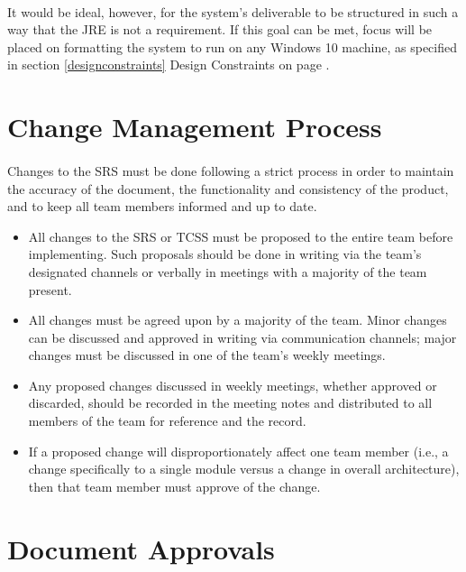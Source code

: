 \documentclass{article}
\begin{document}
    \paragraph{} It would be ideal, however, for the system's deliverable to be structured in such a way that the JRE is not a requirement. If this goal can be met, focus will be placed on formatting the system to run on any Windows 10 machine, as specified in section \ref{designconstraints} Design Constraints on page \pageref{designconstraints}.
    


\section{Change Management Process}

\paragraph{}
Changes to the SRS  must be done following a strict process in order to maintain the accuracy of the document, the functionality and consistency of the product, and to keep all team members informed and up to date.
\begin{itemize}
    \item All changes to the SRS  or TCSS must be proposed to the entire team before implementing. Such proposals should be done in writing via the team's designated channels or verbally in meetings with a majority of the team present.
    \item All changes must be agreed upon by a majority of the team. Minor changes can be discussed and approved in writing via communication channels; major changes must be discussed in one of the team's weekly meetings.
    \item Any proposed changes discussed in weekly meetings, whether approved or discarded, should be recorded in the meeting notes and distributed to all members of the team for reference and the record.
    \item If a proposed change will disproportionately affect one team member (i.e., a change specifically to a single module versus a change in overall architecture), then that team member must approve of the change.
\end{itemize}

\section{Document Approvals}
\end{document}
